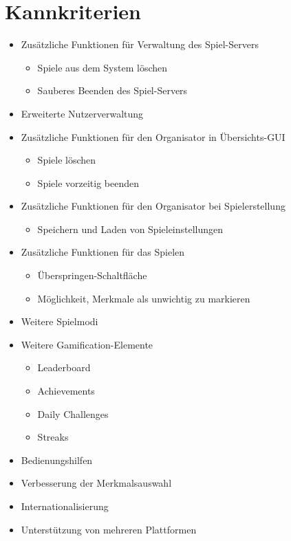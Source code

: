 \documentclass[a4paper]{scrreprt}
\begin{document}
    \section{Kannkriterien}
    \begin{itemize} %
    	\item Zusätzliche Funktionen für Verwaltung des Spiel-Servers
   	\begin{itemize}
            \item Spiele aus dem System löschen
            \item Sauberes Beenden des Spiel-Servers 
        \end{itemize}
	\item Erweiterte Nutzerverwaltung 
	\item Zusätzliche Funktionen für den \Gls{Organisator} in Übersichts-GUI
        \begin{itemize}
            \item Spiele löschen 
            \item Spiele vorzeitig beenden 
        \end{itemize}
	\item Zusätzliche Funktionen für den \Gls{Organisator} bei Spielerstellung
        \begin{itemize}
            \item Speichern und Laden von \Gls{Spieleinstellungen}
        \end{itemize}
        \item Zusätzliche Funktionen für das Spielen 
        \begin{itemize}
            \item Überspringen-Schaltfläche 
            \item Möglichkeit, Merkmale als unwichtig zu markieren 
        \end{itemize}
	\item Weitere Spielmodi 
	\item Weitere Gamification-Elemente %
        \begin{itemize}
            \item Leaderboard %
            \item Achievements %
            \item Daily Challenges %
            \item Streaks %
        \end{itemize}
        \item Bedienungshilfen 
        \item Verbesserung der Merkmalsauswahl %
        \item Internationalisierung 
        \item Unterstützung von mehreren Plattformen
    \end{itemize}
\end{document}
